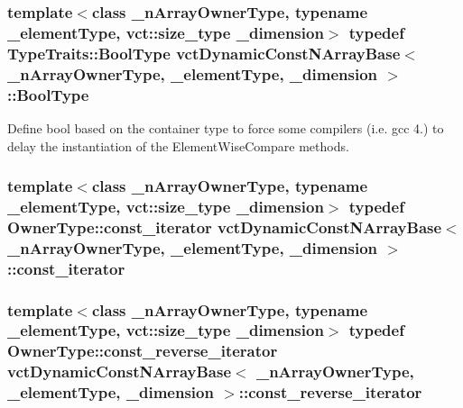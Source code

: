 \subsubsection[{Bool\+Type}]{\setlength{\rightskip}{0pt plus 5cm}template$<$class \+\_\+n\+Array\+Owner\+Type, typename \+\_\+element\+Type, vct\+::size\+\_\+type \+\_\+dimension$>$ typedef {\bf Type\+Traits\+::\+Bool\+Type} {\bf vct\+Dynamic\+Const\+N\+Array\+Base}$<$ \+\_\+n\+Array\+Owner\+Type, \+\_\+element\+Type, \+\_\+dimension $>$\+::{\bf Bool\+Type}}\label{classvct_dynamic_const_n_array_base_a16bf688936f61d1298ced8f637cfc1f8}
Define bool based on the container type to force some compilers (i.\+e. gcc 4.) to delay the instantiation of the Element\+Wise\+Compare methods. \hypertarget{classvct_dynamic_const_n_array_base_a026881a1dc4be02626681c9c3056395b}{}
\subsubsection[{const\+\_\+iterator}]{\setlength{\rightskip}{0pt plus 5cm}template$<$class \+\_\+n\+Array\+Owner\+Type, typename \+\_\+element\+Type, vct\+::size\+\_\+type \+\_\+dimension$>$ typedef Owner\+Type\+::const\+\_\+iterator {\bf vct\+Dynamic\+Const\+N\+Array\+Base}$<$ \+\_\+n\+Array\+Owner\+Type, \+\_\+element\+Type, \+\_\+dimension $>$\+::{\bf const\+\_\+iterator}}\label{classvct_dynamic_const_n_array_base_a026881a1dc4be02626681c9c3056395b}
\hypertarget{classvct_dynamic_const_n_array_base_a133cecf87f369296ad391ce3b697466b}{}
\subsubsection[{const\+\_\+reverse\+\_\+iterator}]{\setlength{\rightskip}{0pt plus 5cm}template$<$class \+\_\+n\+Array\+Owner\+Type, typename \+\_\+element\+Type, vct\+::size\+\_\+type \+\_\+dimension$>$ typedef Owner\+Type\+::const\+\_\+reverse\+\_\+iterator {\bf vct\+Dynamic\+Const\+N\+Array\+Base}$<$ \+\_\+n\+Array\+Owner\+Type, \+\_\+element\+Type, \+\_\+dimension $>$\+::{\bf const\+\_\+reverse\+\_\+iterator}}\label{classvct_dynamic_const_n_array_base_a133cecf87f369296ad391ce3b697466b}
\hypertarget{classvct_dynamic_const_n_array_base_a412fcb88d50ea2e1d809efab113968fc}{}
